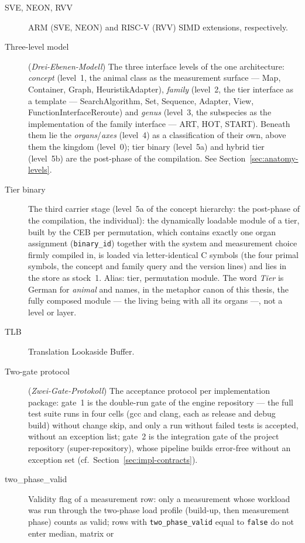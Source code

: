 \begin{description}
  \item[SVE, NEON, RVV] ARM (SVE, NEON) and RISC-V (RVV) SIMD extensions, respectively.
  \item[Three-level model] (\emph{Drei-Ebenen-Modell}) The three interface levels of the one
  architecture: \emph{concept} (level~1, the animal class as the measurement surface --- Map,
  Container, Graph, HeuristikAdapter), \emph{family} (level~2, the tier interface as a template ---
  SearchAlgorithm, Set, Sequence, Adapter, View, FunctionInterfaceReroute) and \emph{genus} (level~3,
  the subspecies as the implementation of the family interface --- ART, HOT, START). Beneath them lie
  the \emph{organs}/\emph{axes} (level~4) as a classification of their own, above them the kingdom
  (level~0); tier binary (level~5a) and hybrid tier (level~5b) are the post-phase of the compilation.
  See Section~\ref{sec:anatomy-levels}.
  \item[Tier binary] The third carrier stage (level~5a of the concept hierarchy: the post-phase of the
  compilation, the individual): the dynamically loadable module of a tier, built by
  the CEB per permutation, which contains exactly one organ assignment (\texttt{binary\_id})
  together with the system and measurement choice firmly compiled in, is loaded via
  letter-identical C symbols (the four primal symbols, the concept and family query and the
  version lines) and lies in the store as stock~1. Alias: tier, permutation module. The word \emph{Tier} is German for
  \emph{animal} and names, in the metaphor canon of this thesis, the fully composed module --- the living
  being with all its organs ---, not a level or layer.
  \item[TLB] Translation Lookaside Buffer.
  \item[Two-gate protocol] (\emph{Zwei-Gate-Protokoll}) The acceptance protocol per implementation
  package: gate~1 is the double-run gate of the engine repository --- the full test suite runs in
  four cells (gcc and clang, each as release and debug build) without change skip, and only a run
  without failed tests is accepted, without an exception list; gate~2 is the integration gate of
  the project repository (super-repository), whose pipeline builds error-free without an exception
  set (cf.\ Section~\ref{sec:impl-contracts}).
  \item[two\_phase\_valid] Validity flag of a measurement row: only a measurement whose workload
  was run through the two-phase load profile (build-up, then measurement phase) counts as valid;
  rows with \texttt{two\_phase\_valid} equal to \texttt{false} do not enter median, matrix or

\end{description}
